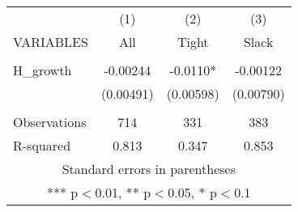 \documentclass[]{article}
\begin{document}
\begin{tabular}{lccc} \hline
 & (1) & (2) & (3) \\
VARIABLES & All & Tight & Slack \\ \hline
 &  &  &  \\
H\_growth & -0.00244 & -0.0110* & -0.00122 \\
 & (0.00491) & (0.00598) & (0.00790) \\
 &  &  &  \\
Observations & 714 & 331 & 383 \\
 R-squared & 0.813 & 0.347 & 0.853 \\ \hline
\multicolumn{4}{c}{ Standard errors in parentheses} \\
\multicolumn{4}{c}{ *** p$<$0.01, ** p$<$0.05, * p$<$0.1} \\
\end{tabular}
\end{document}
